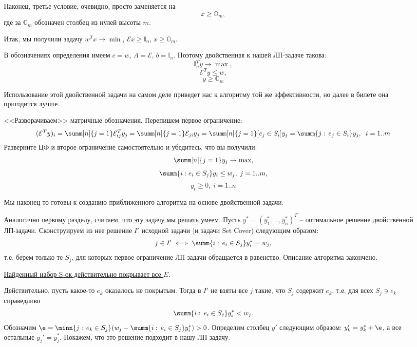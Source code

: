 Наконец, третье условие, очевидно, просто заменяется на $$x \geq \mathbb{O}_m,$$ где за $\mathbb{O}_m$ обозначен столбец из нулей высоты $m$.

Итак, мы получили задачу $w^Tx \rightarrow \min$, $\mathcal{E} x \geq \mathbb{I}_n$, $x \geq \mathbb{O}_m$. 


В обозначениях определения имеем $c = w$, $A = \mathcal E$, $b = \mathbb{I}_n$. Поэтому двойственная к нашей ЛП-задаче такова: 
$$\mathbb{I}_n^Ty \rightarrow \max,$$
$$\mathcal{E}^T y \leq w,$$
$$y \geq \mathbb{O}_m$$

Использование этой двойственной задачи на самом деле приведет нас к алгоритму той же эффективности, но далее в билете она пригодится лучше. 

<<Разворачиваем>> матричные обозначения. Перепишем первое ограничение:
$$(\mathcal{E}^Ty)_i = \summ[n]{j=1}\mathcal{E}^T_{ij}y_j = \summ [n]{j=1}\mathcal{E}_{ji}y_j = \summ[n]{j=1} [e_j \in S_i] y_j = \summ{j:\, e_j \in S_i} y_j, \;\; i=1..m$$
Разверните ЦФ и второе ограничение самостоятельно и убедитесь, что вы получили:
$$\summ[n]{j=1} y_j \rightarrow\max,$$
$$\summ{i: e_i \in S_j} y_i\leq w_j, \; j=1..m,$$
$$y_i \geq 0, \; i=1..n$$

Мы наконец-то готовы к созданию приближенного алгоритма на основе двойственной задачи. 


Аналогично первому разделу, \underline{считаем, что эту задачу мы решать умеем.} Пусть $y^* = (y_1^*, ..., y_n^*)^T$ -- оптимальное решение двойственной ЛП-задачи. Сконструируем из нее решение $I'$ исходной задачи (и задачи Set Cover) следующим образом:
$$j \in I' \iff \summ{i:\, e_i \in S_j}y_i^* = w_j,$$
т.е. берем только те $S_j$, для которых первое ограничение ЛП-задачи обращается в равенство.
Описание алгоритма закончено.

\underline{Найденный набор S-ок действительно покрывает все $E$}.

Действительно, пусть какое-то $e_k$ оказалось не покрытым. Тогда в $I'$ не взяты все $j$ такие, что $S_j$ содержит $e_k$, т.е. для всех $S_j \ni e_k$ справедливо $$\summ{i:\, e_i \in S_j}y_i^* < w_j.$$ 
Обозначим $\e = \minn{j:\, e_k \in S_j} (w_j - \summ{i:\, e_i \in S_j}y_i^*) > 0$. Определим столбец $y'$ следующим образом: $y_k' = y_k^* + \e$, а все остальные $y_j' = y_j^*$. Покажем, что это решение подходит в нашу ЛП-задачу. 


